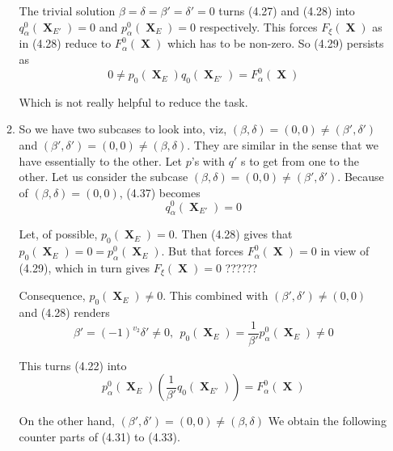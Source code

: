 \documentclass[a4paper,12pt]{article}
\DeclareMathOperator{\x}{\mathrm{X}}
\theoremstyle{definition}
\theoremstyle{underlinethm}
\theoremstyle{definition}
\begin{document}
\begin{enumerate}[label=(\alph*)]
\begin{enumerate}[label=(\alph*)]
The trivial solution $\beta = \delta = \beta' = \delta' = 0$ turns  (4.27) and (4.28) into $q_{\alpha}^{0} (\boldsymbol{\x}_{E'}) = 0$ and $p_{\alpha}^{0}(\boldsymbol{\x}_{E})=0$ respectively. This forces $F_{\xi}(\boldsymbol{\x})$ as in (4.28) reduce to $F_{\alpha}^{0}(\boldsymbol{\x})$ which has to be non-zero. So (4.29) persists as
\begin{equation}
0 \neq p_{0}(\boldsymbol{\x}_{E}) q_{0}(\boldsymbol{\x}_{E'}) = F_{\alpha}^{0}(\boldsymbol{\x})\tag{4.37}\label{eq-4.37}
\end{equation}

Which is not really helpful to reduce the task.

\item So we have two subcases to look into, viz, $(\beta, \delta) =(0,0) \neq (\beta', \delta')$ and $(\beta', \delta') = (0,0) \neq (\beta, \delta)$. They are similar in the sense that we have essentially to the other. Let $p$'s with $q'$ s to get from one to the other. Let us consider the subcase $(\beta, \delta) =(0,0) \neq (\beta', \delta')$. Because of $(\beta, \delta) = (0,0)$, (4.37) becomes 
\begin{equation}
q_{\alpha}^{0}(\boldsymbol{\x}_{E'})= 0\tag{4.38}\label{eq-4.38}
\end{equation}  

Let, of possible, $p_{0}(\boldsymbol{\x}_{E})=0$. Then (4.28) gives that $p_{0}(\boldsymbol{\x}_{E})=0 = p_{\alpha}^{0}(\boldsymbol{\x}_{E})$. But that forces $F_{\alpha}^{0}(\boldsymbol{\x})=0$ in view of (4.29), which in turn gives $F_{\xi}(\boldsymbol{\x})=0$ ??????

Consequence, $p_{0}(\boldsymbol{\x}_{E}) \neq  0$. This combined with $(\beta', \delta') \neq (0,0)$ and (4.28) renders 
\begin{equation}
\beta'=(-1)^{v_{2}} \delta' \neq 0, ~~p_{0}(\boldsymbol{\x}_{E}) = \frac{1}{\beta'} p_{\alpha}^{0}(\boldsymbol{\x}_{E}) \neq 0\tag{4.39}\label{eq-4.39}
\end{equation} 

This turns (4.22) into
\begin{equation}
p_{\alpha}^{0} (\boldsymbol{\x}_{E}) \left(\frac{1}{\beta'} q_{0} (\boldsymbol{\x}_{E'}) \right) = F_{\alpha}^{0}(\boldsymbol{\x})\tag{4.40}\label{eq-4.40}
\end{equation}

On the other hand, $(\beta', \delta') = (0,0) \neq (\beta, \delta)$ We obtain the following counter parts of (4.31) to (4.33).


\end{enumerate}
\end{enumerate}
\end{document}
